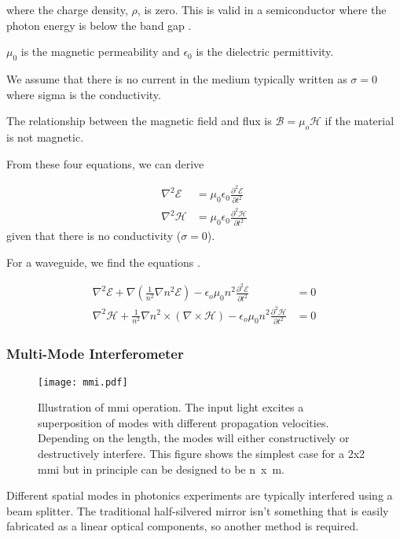 where the charge density, $\rho$, is zero. This is valid in a semiconductor where the photon energy is below the band gap \cite{SilverstoneThesis}.

$\mu_0$ is the magnetic permeability and $\epsilon_0$ is the dielectric permittivity.

We assume that there is no current in the medium typically written as $\sigma = 0$ where sigma is the conductivity.

The relationship between the magnetic field and flux is $\mathcal{B} = \mu_o \mathcal{H}$ if the material is not magnetic.

From these four equations, we can derive

\begin{align}
	\nabla^2\mathcal{E} &= \mu_0\epsilon_0\frac{\partial^2\mathcal{E}}{\partial t^2}\\ 
	\nabla^2\mathcal{H} &= \mu_0\epsilon_0\frac{\partial^2\mathcal{H}}{\partial t^2}
\end{align}
given that there is no conductivity ($\sigma=0$).

For a waveguide, we find the equations \cite{lifante2003integrated}.

\begin{align}
	\nabla^2\mathcal{E} + \nabla\left(\frac{1}{n^2}\nabla n^2\mathcal{E}\right) - \epsilon_o\mu_0 n^2 \frac{\partial^2\mathcal{E}}{\partial t^2} &= 0\\
	\nabla^2\mathcal{H} + \frac{1}{n^2}\nabla n^2\times\left(\nabla\times\mathcal{H}\right) - \epsilon_o\mu_0 n^2 \frac{\partial^2\mathcal{H}}{\partial t^2} &= 0
\end{align}

\subsubsection*{Multi-Mode Interferometer}

\begin{figure}[t]
	\centering
	\texttt{[image: mmi.pdf]}
	\caption[Multi-mode interferometer operating principle]{Illustration of \acs{mmi} operation. The input light excites a superposition of modes with different propagation velocities. Depending on the length, the modes will either constructively or destructively interfere. This figure shows the simplest case for a \si{2x2} \acs{mmi} but in principle can be designed to be \si{n x m}.}
	\label{fig:mmi}
\end{figure}

Different spatial modes in photonics experiments are typically interfered using a beam splitter. The traditional half-silvered mirror isn't something that is easily fabricated as a linear optical components, so another method is required.

